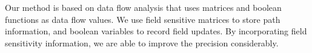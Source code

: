 Our method is based on  data flow analysis that uses matrices
and  boolean functions  as  data flow  values.  We use  field
sensitive  matrices to  store path  information,  and boolean
variables  to record  field updates.  By  incorporating field
sensitivity information, we are able to improve the precision
considerably.
